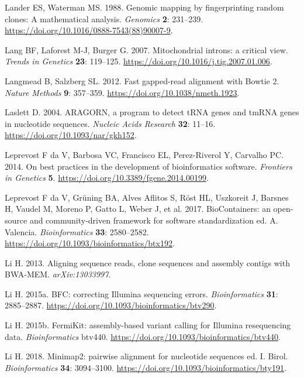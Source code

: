 \documentclass[
  12pt,
  oneside,
  openany]{book}
\begin{document}
\leavevmode\hypertarget{ref-Lander_1988}{}%
Lander ES, Waterman MS. 1988. Genomic mapping by fingerprinting random clones: A mathematical analysis. \emph{Genomics} \textbf{2}: 231--239. \url{https://doi.org/10.1016/0888-7543(88)90007-9}.

\leavevmode\hypertarget{ref-Lang_2007}{}%
Lang BF, Laforest M-J, Burger G. 2007. Mitochondrial introns: a critical view. \emph{Trends in Genetics} \textbf{23}: 119--125. \url{https://doi.org/10.1016/j.tig.2007.01.006}.

\leavevmode\hypertarget{ref-Langmead_2012}{}%
Langmead B, Salzberg SL. 2012. Fast gapped-read alignment with Bowtie 2. \emph{Nature Methods} \textbf{9}: 357--359. \url{https://doi.org/10.1038/nmeth.1923}.

\leavevmode\hypertarget{ref-Laslett_2004}{}%
Laslett D. 2004. ARAGORN, a program to detect tRNA genes and tmRNA genes in nucleotide sequences. \emph{Nucleic Acids Research} \textbf{32}: 11--16. \url{https://doi.org/10.1093/nar/gkh152}.

\leavevmode\hypertarget{ref-Leprevost_2014}{}%
Leprevost F da V, Barbosa VC, Francisco EL, Perez-Riverol Y, Carvalho PC. 2014. On best practices in the development of bioinformatics software. \emph{Frontiers in Genetics} \textbf{5}. \url{https://doi.org/10.3389/fgene.2014.00199}.

\leavevmode\hypertarget{ref-Leprevost_2017}{}%
Leprevost F da V, Grüning BA, Alves Aflitos S, Röst HL, Uszkoreit J, Barsnes H, Vaudel M, Moreno P, Gatto L, Weber J, et al. 2017. BioContainers: an open-source and community-driven framework for software standardization ed. A. Valencia. \emph{Bioinformatics} \textbf{33}: 2580--2582. \url{https://doi.org/10.1093/bioinformatics/btx192}.

\leavevmode\hypertarget{ref-Li_2013}{}%
Li H. 2013. Aligning sequence reads, clone sequences and assembly contigs with BWA-MEM. \emph{arXiv:13033997}.

\leavevmode\hypertarget{ref-Li_2015_BFC}{}%
Li H. 2015a. BFC: correcting Illumina sequencing errors. \emph{Bioinformatics} \textbf{31}: 2885--2887. \url{https://doi.org/10.1093/bioinformatics/btv290}.

\leavevmode\hypertarget{ref-Li_2015_FermiKit}{}%
Li H. 2015b. FermiKit: assembly-based variant calling for Illumina resequencing data. \emph{Bioinformatics} btv440. \url{https://doi.org/10.1093/bioinformatics/btv440}.

\leavevmode\hypertarget{ref-Li_2018}{}%
Li H. 2018. Minimap2: pairwise alignment for nucleotide sequences ed. I. Birol. \emph{Bioinformatics} \textbf{34}: 3094--3100. \url{https://doi.org/10.1093/bioinformatics/bty191}.
\end{document}
